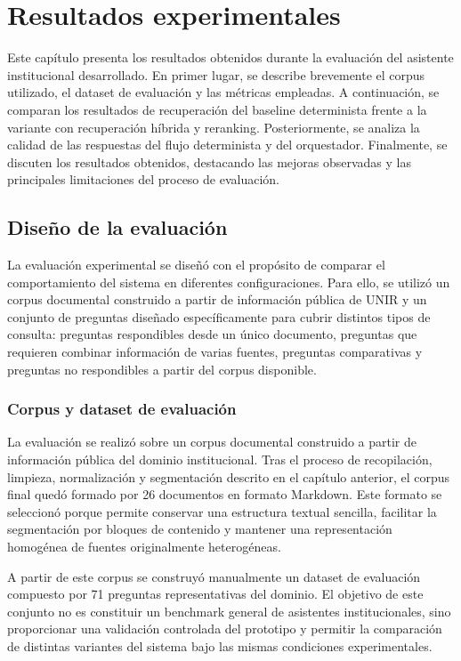 \chapter{Resultados experimentales}\label{chap:resultados}

Este capítulo presenta los resultados obtenidos durante la evaluación del asistente institucional desarrollado. 
En primer lugar, se describe brevemente el corpus utilizado, el dataset de evaluación y las métricas empleadas. 
A continuación, se comparan los resultados de recuperación del baseline determinista frente a la variante con recuperación híbrida y reranking. 
Posteriormente, se analiza la calidad de las respuestas del flujo determinista y del orquestador. 
Finalmente, se discuten los resultados obtenidos, destacando las mejoras observadas y las principales limitaciones del proceso de evaluación.

\section{Diseño de la evaluación}\label{sec:diseno-evaluacion}

La evaluación experimental se diseñó con el propósito de comparar el comportamiento del sistema en diferentes configuraciones. 
Para ello, se utilizó un corpus documental construido a partir de información pública de UNIR y un conjunto de preguntas diseñado específicamente para cubrir distintos tipos de consulta: preguntas respondibles desde un único documento, preguntas que requieren combinar información de varias fuentes, preguntas comparativas y preguntas no respondibles a partir del corpus disponible.

\subsection{Corpus y dataset de evaluación}\label{subsec:corpus-dataset}

La evaluación se realizó sobre un corpus documental construido a partir de información pública del dominio institucional. 
Tras el proceso de recopilación, limpieza, normalización y segmentación descrito en el capítulo anterior, el corpus final quedó formado por 26 documentos en formato Markdown. 
Este formato se seleccionó porque permite conservar una estructura textual sencilla, facilitar la segmentación por bloques de contenido y mantener una representación homogénea de fuentes originalmente heterogéneas.

A partir de este corpus se construyó manualmente un dataset de evaluación compuesto por 71 preguntas representativas del dominio. 
El objetivo de este conjunto no es constituir un benchmark general de asistentes institucionales, sino proporcionar una validación controlada del prototipo y permitir la comparación de distintas variantes del sistema bajo las mismas condiciones experimentales.

